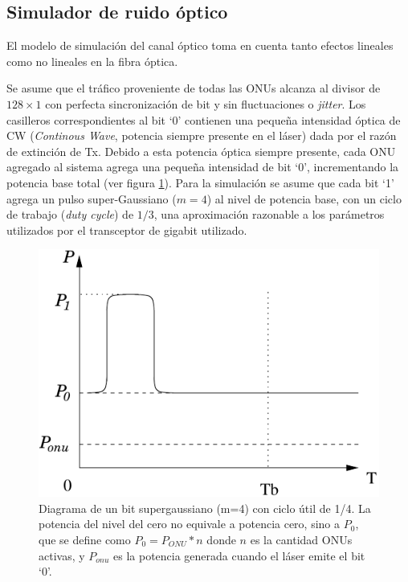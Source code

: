 \subsection{Simulador de ruido óptico} 

El modelo de simulación del canal óptico toma en cuenta tanto efectos lineales como no lineales en la fibra óptica. 

Se asume que el tráfico proveniente de todas las ONUs alcanza al divisor de $128\times1$ con perfecta sincronización de bit y sin fluctuaciones o \textit{jitter}.
Los casilleros correspondientes al bit `0' contienen una pequeña intensidad óptica de CW (\textit{Continous Wave}, potencia siempre presente en el láser) dada por el razón de extinción de Tx.
Debido a esta potencia óptica siempre presente, cada ONU agregado al sistema agrega una pequeña intensidad de bit `0', incrementando la potencia base total (ver figura \ref{sim:extinction}).
Para la simulación se asume que cada bit `1' agrega un pulso super-Gaussiano ($m=4$) al nivel de potencia base, con un ciclo de trabajo (\textit{duty cycle}) de $1/3$, una aproximación razonable a los parámetros utilizados por el transceptor de gigabit utilizado.

\begin{figure}[!t]
    \centering
      \includegraphics[width=3.5 in]{graphs/extinction.pdf}
      \caption{Diagrama de un bit supergaussiano (m=4) con ciclo útil de 1/4. La potencia del nivel del cero no equivale a potencia cero, sino a $P_0$, que se define como $P_0=P_{ONU}*n$ donde $n$ es la cantidad ONUs activas, y $P_{onu}$ es la potencia generada cuando el láser emite el bit `0'.}
      \label{sim:extinction}
\end{figure}

